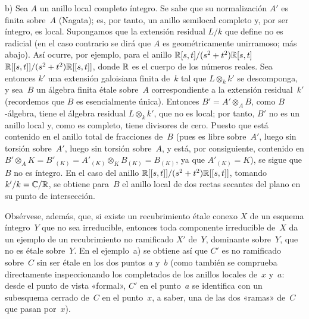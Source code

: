 \noindent
b) Sea $A$ un anillo local completo íntegro. Se sabe que su normalización $A'$ es finita
sobre~$A$ (Nagata); es, por tanto, un anillo semilocal completo y, por ser íntegro, es local. Supongamos que la extensión residual $L/k$ que define no es radicial (en el caso contrario se dirá que $A$ es geométricamente unirramoso; \cf más abajo). Así ocurre, por ejemplo, para el anillo
{$\mathbb R[s,t]/(s^2+t^2)\mathbb R[s,t]$}
{$\mathbb R[[s,t]]/(s^2+t^2)\mathbb R[[s,t]]$},%
donde $\mathbb R$ es el cuerpo de los números reales. Sea entonces $k'$ una extensión galoisiana finita de~$k$ tal que $L\otimes_kk'$ se descomponga, y sea~$B$ un álgebra finita étale sobre~$A$ correspondiente a la extensión residual~$k'$ (recordemos que $B$ es esencialmente única). Entonces $B'=A'\otimes_AB$, como $B$-álgebra, tiene el álgebra residual $L\otimes_kk'$, que no es local; por tanto, $B'$ no es un anillo local y, como es completo, tiene divisores de cero. Puesto que está contenido en el anillo total de fracciones de~$B$ (pues es libre sobre~$A'$, luego sin torsión sobre~$A'$, luego sin torsión sobre~$A$, y está, por consiguiente, contenido en $B'\otimes_AK=B'_{(K)}=A'_{(K)}\otimes_KB_{(K)}=B_{(K)}$, ya que $A'_{(K)}=K$), se sigue que $B$ no es íntegro. En el caso del anillo $\mathbb R[[s,t]]/(s^2+t^2)\mathbb R[[s,t]]$, tomando $k'/k=\mathbb C/\mathbb R$, se obtiene para~$B$ el anillo local de dos rectas secantes del plano en su punto de intersección.

Obsérvese, además, que, si existe un recubrimiento étale conexo $X$ de un esquema íntegro~$Y$ que no sea irreducible, entonces toda componente irreducible de~$X$ da un ejemplo de un recubrimiento no ramificado $X'$ de~$Y$, dominante sobre~$Y$, que no es étale sobre~$Y$. En el ejemplo~a) se obtiene así que $C'$ es no ramificado sobre~$C$ sin ser étale en los dos puntos $a$ y~$b$ (como también se comprueba directamente inspeccionando los completados de los anillos locales de~$x$ y~$a$: desde el punto de vista «formal», $C'$ en el punto~$a$ se identifica con un subesquema cerrado de~$C$ en el punto~$x$, a saber, una de las dos «ramas» de~$C$ que pasan por~$x$).

